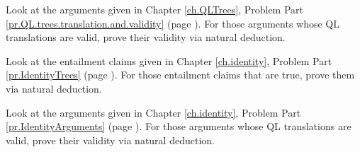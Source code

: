 \problempart
\label{pr.QLND.trees1}
Look at the arguments given in Chapter \ref{ch.QLTrees}, Problem Part \ref{pr.QL.trees.translation.and.validity} (page \pageref{pr.QL.trees.translation.and.validity}). For those arguments whose QL translations are valid, prove their validity via natural deduction.

\problempart
\label{pr.QLND.trees2}
Look at the entailment claims given in Chapter \ref{ch.identity}, Problem Part \ref{pr.IdentityTrees} (page \pageref{pr.IdentityTrees}). For those entailment claims that are true, prove them via natural deduction.

\problempart
\label{pr.QLND.trees3}
Look at the arguments given in Chapter \ref{ch.identity}, Problem Part \ref{pr.IdentityArguments} (page \pageref{pr.IdentityArguments}). For those arguments whose QL translations are valid, prove their validity via natural deduction.
